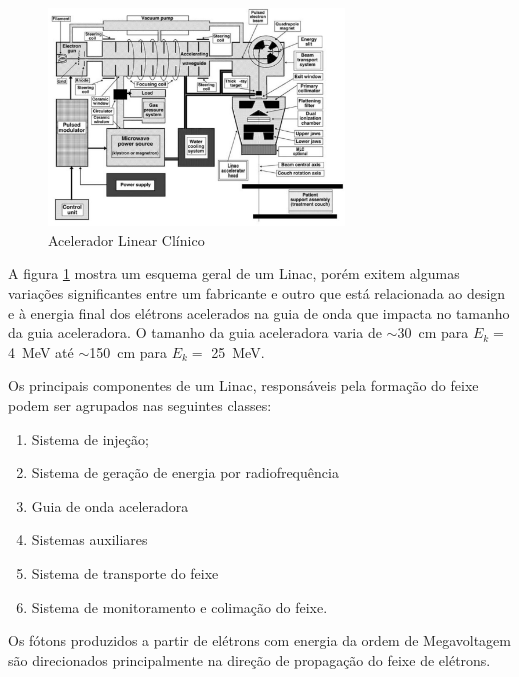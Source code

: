\documentclass[11pt,a4paper]{article}
\begin{document}
                \begin{figure}[h]
                    \centering
                    \includegraphics[width=0.7\textwidth]{Imagens/esquemaAceleradorLinear.jpg}
                    \caption{Acelerador Linear Clínico}
                    \label{fig:esquemaAceleradorLinear}
                \end{figure}

            
                A figura \ref{fig:esquemaAceleradorLinear} mostra um esquema geral de um Linac, porém exitem algumas variações significantes entre um fabricante e outro que está relacionada ao design e à energia final dos elétrons acelerados na guia de onda que impacta no tamanho da guia aceleradora. O tamanho da guia aceleradora varia de $\sim $\qty{30}{cm} para $E_k = $ \qty{4}{MeV} até $\sim $\qty{150}{cm} para $E_k = $ \qty{25}{MeV}.

                Os principais componentes de um Linac, responsáveis pela formação do feixe podem ser agrupados nas seguintes classes:

                \begin{enumerate}
                    \item Sistema de injeção;
                    \item Sistema de geração de energia por radiofrequência
                    \item Guia de onda aceleradora
                    \item Sistemas auxiliares
                    \item Sistema de transporte do feixe
                    \item Sistema de monitoramento e colimação do feixe.
                \end{enumerate}
            
            Os fótons produzidos a partir de elétrons com energia da ordem de Megavoltagem são direcionados principalmente na direção de propagação do feixe de elétrons. 
            
\end{document}
